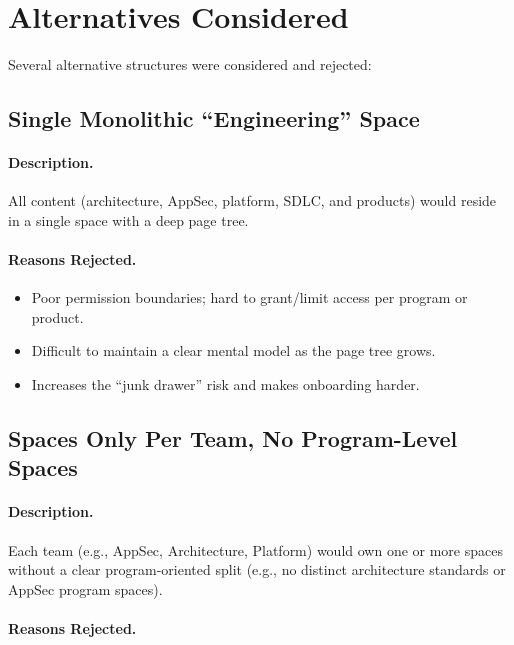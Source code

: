 \documentclass[11pt]{article}
\begin{document}
\section{Alternatives Considered}

Several alternative structures were considered and rejected:

\subsection{Single Monolithic ``Engineering'' Space}

\paragraph{Description.}
All content (architecture, AppSec, platform, SDLC, and products)
would reside in a single space with a deep page tree.

\paragraph{Reasons Rejected.}

\begin{itemize}[leftmargin=*]
  \item Poor permission boundaries; hard to grant/limit access per
        program or product.
  \item Difficult to maintain a clear mental model as the page tree
        grows.
  \item Increases the ``junk drawer'' risk and makes onboarding
        harder.
\end{itemize}

\subsection{Spaces Only Per Team, No Program-Level Spaces}

\paragraph{Description.}
Each team (e.g., AppSec, Architecture, Platform) would own one or
more spaces without a clear program-oriented split (e.g., no distinct
architecture standards or AppSec program spaces).

\paragraph{Reasons Rejected.}
\end{document}
